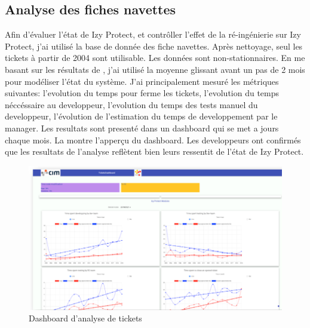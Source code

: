 \documentclass[a4paper]{article}
\begin{document}
\subsection{Analyse des fiches navettes}
\label{sec:analyseDesFichesNavettes}
Afin d'évaluer l'état de Izy Protect, et contrôller l'effet de la ré-ingénierie sur Izy Protect,
 j'ai utilisé la base de donnée des fiche navettes. 
Après nettoyage, seul les tickets à partir de 2004 sont utilisable. 
Les données sont non-stationnaires. 
En me basant sur les résultats de \cite{Raja09}, j'ai utilisé la moyenne glissant avant un pas de 2 mois pour modéliser l'état du système.
J'ai principalement mesuré les métriques suivantes: l'evolution du temps pour ferme les tickets, l'evolution du temps néccéssaire au developpeur, l'evolution du temps des tests manuel du developpeur,
l'évolution de l'estimation du temps de developpement par le manager.
Les resultats sont presenté dans un dashboard qui se met a jours chaque mois.
La  montre l'apperçu du dashboard.
Les developpeurs ont confirmés que les resultats de l'analyse reflètent bien leurs ressentit de l'état de Izy Protect. 

\begin{figure}[htbp]
  \begin{center}
  \includegraphics[width=\textwidth]{./figures/dashboard.png}
  \caption{Dashboard d'analyse de tickets}
  \label{fig:dashboardFig}
\end{center}
\vspace{-0.3cm}
\end{figure}
\end{document}
